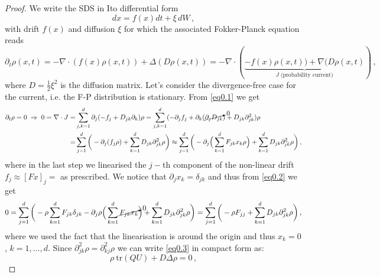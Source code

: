 \documentclass[../main.tex]{subfiles}
\begin{document}
     \begin{proof}
          We write the SDS in Ito differential form
          \begin{equation*}
               dx = f(x)dt + \xi\,dW\,,
          \end{equation*}
          with drift $f(x)$ and diffusion $\xi$ for which the associated Fokker-Planck equation reads
          \begin{equation}\label{eq0.1}
                  \partial_{t}\rho(x,t)=-\nabla\cdot(f(x)\rho(x,t))+\Delta(D\rho(x,t))=-\nabla\cdot(\underbrace{-f(x)\rho(x,t))+\nabla(D\rho(x,t)}_{J\;\text{(probability current)}})\,, 
          \end{equation}
          where $D=\frac{1}{2}\xi^{2}$ is the diffusion matrix. Let's consider the divergence-free case for the current, i.e. the F-P distribution is stationary. From \eqref{eq0.1} we get
          \begin{align}
                  \partial_{t}\rho=0\;\Rightarrow\;0=\nabla\cdot J =& \sum_{j,k=1}^{d}\partial_{j}(-f_{j}+D_{jk}\partial_{k})\rho = \sum_{j,k=1}^{d}(-\partial_{j}f_{j}+\partial_{k}(\cancelto{0}{\partial_{j}D_{jk}})+D_{jk}\partial_{jk}^{2})\rho \nonumber \\
                  =& \sum_{j=1}^{d}\bigg(-\partial_{j}(f_{j}\rho)+\sum_{k=1}^{d}D_{jk}\partial_{jk}^{2}\rho\bigg) \approx \sum_{j=1}^{d}\bigg(-\partial_{j}\Big(\sum_{k=1}^{d}F_{jk}x_{k}\rho\Big)+\sum_{k=1}^{d}D_{jk}\partial_{jk}^{2}\rho\bigg) \,, \label{eq0.2} 
          \end{align}
          where in the last step we linearised the $j-$th component of the non-linear drift $f_{j}\approx[Fx]_{j}=$ as prescribed.
          We notice that $\partial_{j}x_{k}=\delta_{jk}$ and thus from \eqref{eq0.2} we get
          \begin{equation}\label{eq0.3}
                  0 = \sum_{j=1}^{d}\bigg(-\rho \sum_{k=1}^{d}F_{jk}\delta_{jk}-\partial_{j}\rho\Big(\sum_{k=1}^{d}\cancelto{0}{F_{jk}x_{k}}\Big) + \sum_{k=1}^{d}D_{jk}\partial_{jk}^{2}\rho\bigg) = \sum_{j=1}^{d}\bigg(-\rho F_{jj}+\sum_{k=1}^{d}D_{jk}\partial_{jk}^{2}\rho\bigg)\,, 
          \end{equation}
          where we used the fact that the linearisation is around the origin and thus $x_{k}=0$, $k=1,\dots,d$. Since $\partial_{jk}^{2}\rho=\partial_{kj}^{2}\rho$ we can write \eqref{eq0.3} in compact form as:
          \begin{equation}\label{eq0.4}
               \rho\:\text{tr}(QU) + D\Delta\rho=0\,,
          \end{equation}

\end{proof}
\end{document}

